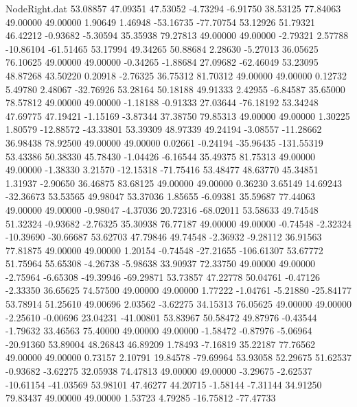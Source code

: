 \begin{filecontents}{NodeRight.dat}
  53.08857   47.09351   47.53052    -4.73294   -6.91750   38.53125   77.84063   49.00000   49.00000    1.90649    1.46948  -53.16735  -77.70754
  53.12926   51.79321   46.42212    -0.93682   -5.30594   35.35938   79.27813   49.00000   49.00000   -2.79321    2.57788  -10.86104  -61.51465
  53.17994   49.34265   50.88684     2.28630   -5.27013   36.05625   76.10625   49.00000   49.00000   -0.34265   -1.88684   27.09682  -62.46049
  53.23095   48.87268   43.50220     0.20918   -2.76325   36.75312   81.70312   49.00000   49.00000    0.12732    5.49780    2.48067  -32.76926
  53.28164   50.18188   49.91333     2.42955   -6.84587   35.65000   78.57812   49.00000   49.00000   -1.18188   -0.91333   27.03644  -76.18192
  53.34248   47.69775   47.19421    -1.15169   -3.87344   37.38750   79.85313   49.00000   49.00000    1.30225    1.80579  -12.88572  -43.33801
  53.39309   48.97339   49.24194    -3.08557  -11.28662   36.98438   78.92500   49.00000   49.00000    0.02661   -0.24194  -35.96435 -131.55319
  53.43386   50.38330   45.78430    -1.04426   -6.16544   35.49375   81.75313   49.00000   49.00000   -1.38330    3.21570  -12.15318  -71.75416
  53.48477   48.63770   45.34851     1.31937   -2.90650   36.46875   83.68125   49.00000   49.00000    0.36230    3.65149   14.69243  -32.36673
  53.53565   49.98047   53.37036     1.85655   -6.09381   35.59687   77.44063   49.00000   49.00000   -0.98047   -4.37036   20.72316  -68.02011
  53.58633   49.74548   51.32324    -0.93682   -2.76325   35.30938   76.77187   49.00000   49.00000   -0.74548   -2.32324  -10.39690  -30.66687
  53.62703   47.79846   49.74548    -2.36932   -9.28112   36.91563   77.81875   49.00000   49.00000    1.20154   -0.74548  -27.21655 -106.61307
  53.67772   51.75964   55.65308    -4.26738   -5.98638   33.90937   72.33750   49.00000   49.00000   -2.75964   -6.65308  -49.39946  -69.29871
  53.73857   47.22778   50.04761    -0.47126   -2.33350   36.65625   74.57500   49.00000   49.00000    1.77222   -1.04761   -5.21880  -25.84177
  53.78914   51.25610   49.00696     2.03562   -3.62275   34.15313   76.05625   49.00000   49.00000   -2.25610   -0.00696   23.04231  -41.00801
  53.83967   50.58472   49.87976    -0.43544   -1.79632   33.46563   75.40000   49.00000   49.00000   -1.58472   -0.87976   -5.06964  -20.91360
  53.89004   48.26843   46.89209     1.78493   -7.16819   35.22187   77.76562   49.00000   49.00000    0.73157    2.10791   19.84578  -79.69964
  53.93058   52.29675   51.62537    -0.93682   -3.62275   32.05938   74.47813   49.00000   49.00000   -3.29675   -2.62537  -10.61154  -41.03569
  53.98101   47.46277   44.20715    -1.58144   -7.31144   34.91250   79.83437   49.00000   49.00000    1.53723    4.79285  -16.75812  -77.47733

\end{filecontents}

